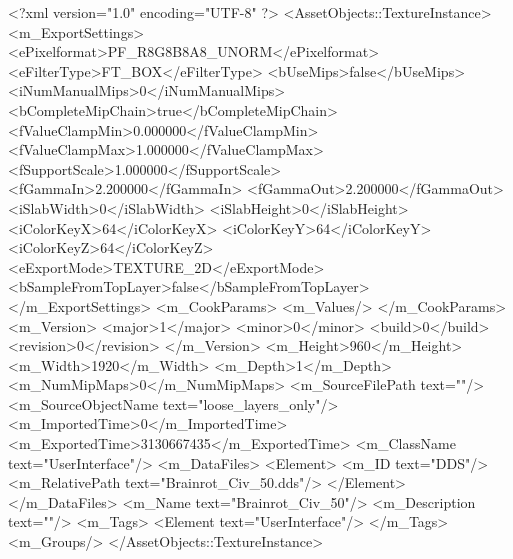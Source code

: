 <?xml version="1.0" encoding="UTF-8" ?>
<AssetObjects::TextureInstance>
	<m_ExportSettings>
		<ePixelformat>PF_R8G8B8A8_UNORM</ePixelformat>
		<eFilterType>FT_BOX</eFilterType>
		<bUseMips>false</bUseMips>
		<iNumManualMips>0</iNumManualMips>
		<bCompleteMipChain>true</bCompleteMipChain>
		<fValueClampMin>0.000000</fValueClampMin>
		<fValueClampMax>1.000000</fValueClampMax>
		<fSupportScale>1.000000</fSupportScale>
		<fGammaIn>2.200000</fGammaIn>
		<fGammaOut>2.200000</fGammaOut>
		<iSlabWidth>0</iSlabWidth>
		<iSlabHeight>0</iSlabHeight>
		<iColorKeyX>64</iColorKeyX>
		<iColorKeyY>64</iColorKeyY>
		<iColorKeyZ>64</iColorKeyZ>
		<eExportMode>TEXTURE_2D</eExportMode>
		<bSampleFromTopLayer>false</bSampleFromTopLayer>
	</m_ExportSettings>
	<m_CookParams>
		<m_Values/>
	</m_CookParams>
	<m_Version>
		<major>1</major>
		<minor>0</minor>
		<build>0</build>
		<revision>0</revision>
	</m_Version>
	<m_Height>960</m_Height>
	<m_Width>1920</m_Width>
	<m_Depth>1</m_Depth>
	<m_NumMipMaps>0</m_NumMipMaps>
	<m_SourceFilePath text=""/>
	<m_SourceObjectName text="loose_layers_only"/>
	<m_ImportedTime>0</m_ImportedTime>
	<m_ExportedTime>3130667435</m_ExportedTime>
	<m_ClassName text="UserInterface"/>
	<m_DataFiles>
		<Element>
			<m_ID text="DDS"/>
			<m_RelativePath text="Brainrot_Civ_50.dds"/>
		</Element>
	</m_DataFiles>
	<m_Name text="Brainrot_Civ_50"/>
	<m_Description text=""/>
	<m_Tags>
		<Element text="UserInterface"/>
	</m_Tags>
	<m_Groups/>
</AssetObjects::TextureInstance>


